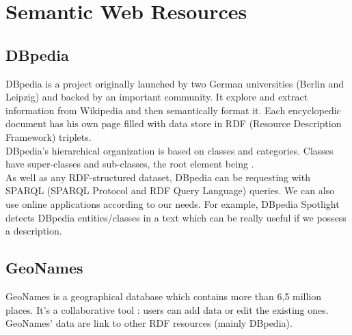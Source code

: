 \chapter{Semantic Web Resources} %

\label{Chapter2} %



\section{DBpedia}

DBpedia is a project originally launched by two German universities (Berlin and Leipzig) and backed by an important community. It explore and extract information from Wikipedia and then semantically format it. Each encyclopedic document has his own page filled with data store in RDF (Resource Description Framework) triplets.\\

DBpedia's hierarchical organization is based on classes and categories. Classes have super-classes and sub-classes, the root element being .\\

As well as any RDF-structured dataset, DBpedia can be requesting with SPARQL (SPARQL Protocol and RDF Query Language) queries. We can also use online applications according to our needs. For example, DBpedia Spotlight detects DBpedia entities/classes in a text which can be really useful if we possess a description.


\section{GeoNames}

GeoNames is a geographical database which contains more than 6,5 million places. It's a collaborative tool : users can add data or edit the existing ones. GeoNames' data are link to other RDF resources (mainly DBpedia). \\

